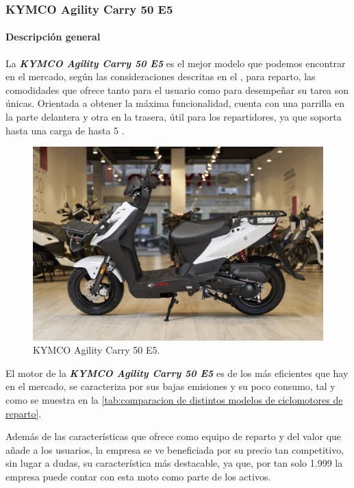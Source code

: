 \subsubsection{KYMCO Agility Carry 50 E5}
\paragraph{Descripción general}
La \textbf{\textit{KYMCO Agility Carry 50 E5}} es el mejor modelo que podemos encontrar en el mercado, según las consideraciones descritas en el , para reparto, las comodidades que ofrece tanto para el usuario como para desempeñar su tarea son únicas. Orientada a obtener la máxima funcionalidad, cuenta con una parrilla en la parte delantera y otra en la trasera, útil para los repartidores, ya que soporta hasta una carga de hasta 5 . 

\begin{figure}[h]
    \centering
    \includegraphics[scale = 0.25]{archivos/KYMCO agility carry.jpg}
    \caption{KYMCO Agility Carry 50 E5.}
    \label{fig:kymco agility carry}
\end{figure}

El motor de la \textbf{\textit{KYMCO Agility Carry 50 E5}} es de los más eficientes que hay en el mercado, se caracteriza por sus bajas emisiones y su poco consumo, tal y como se muestra en la \autoref{tab:comparacion de distintos modelos de ciclomotores de reparto}.

Además de las características que ofrece como equipo de reparto y del valor que añade a los usuarios, la empresa se ve beneficiada por su precio tan competitivo, sin lugar a dudas, su característica más destacable, ya que, por tan solo 1.999  la empresa puede contar con esta moto como parte de los activos. 

